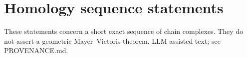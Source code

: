 \documentclass[11pt]{article}
\begin{document}
\section*{Homology sequence statements}
These statements concern a short exact sequence of chain complexes. They do not
assert a geometric Mayer--Vietoris theorem. LLM-assisted text; see PROVENANCE.md.

\end{document}
